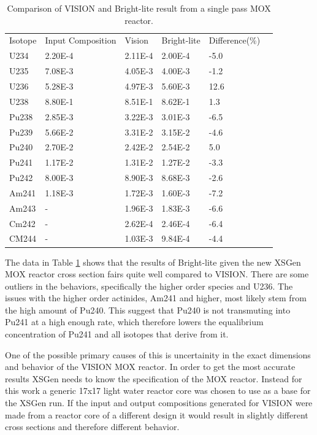 \documentclass{article}
\begin{document}
\begin{table}[!htb]
\centering
\caption{Comparison of VISION and Bright-lite result from a single pass MOX reactor.}
\label{tab:g}
\begin{tabular}{llllll}
Isotope & Input Composition & Vision & Bright-lite & Difference(\%) \\
U234 & 2.20E-4 & 2.11E-4 & 2.00E-4 & -5.0\\
U235 & 7.08E-3 & 4.05E-3 & 4.00E-3 & -1.2\\
U236 & 5.28E-3 & 4.97E-3 & 5.60E-3 & 12.6\\
U238 & 8.80E-1 & 8.51E-1 & 8.62E-1 & 1.3\\
Pu238 & 2.85E-3 & 3.22E-3 & 3.01E-3 & -6.5\\
Pu239 & 5.66E-2 & 3.31E-2 & 3.15E-2 & -4.6\\ 
Pu240 & 2.70E-2 & 2.42E-2 & 2.54E-2 & 5.0\\
Pu241 & 1.17E-2 & 1.31E-2 & 1.27E-2 & -3.3\\
Pu242 & 8.00E-3 & 8.90E-3 & 8.68E-3 & -2.6\\
Am241 & 1.18E-3 & 1.72E-3 & 1.60E-3 & -7.2\\
Am243 & - & 1.96E-3 & 1.83E-3 & -6.6\\
Cm242 & - & 2.62E-4 & 2.46E-4 & -6.4\\
CM244 & - & 1.03E-3 & 9.84E-4 & -4.4
\end{tabular}
\end{table}

The data in Table \ref{tab:g} shows that the results of Bright-lite given the new XSGen MOX reactor cross section fairs quite well compared to VISION. There are some outliers in the behaviors, specifically the higher order species and U236. The issues with the higher order actinides, Am241 and higher, most likely stem from the high amount of Pu240. This suggest that Pu240 is not transmuting into Pu241 at a high enough rate, which therefore lowers the equalibrium concentration of Pu241 and all isotopes that derive from it. 

One of the possible primary causes of this is uncertainity in the exact dimensions and behavior of the VISION MOX reactor. In order to get the most accurate results XSGen needs to know the specification of the MOX reactor. Instead for this work a generic 17x17 light water reactor core was chosen to use as a base for the XSGen run. If the input and output compositions generated for VISION were made from a reactor core of a different design it would result in slightly different cross sections and therefore different behavior. 
\end{document}
